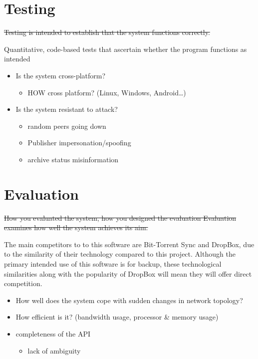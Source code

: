 \documentclass[12pt,a4paper,]{adreport}
\begin{document}
\chapter{Testing}\label{testing}

\sout{Testing is intended to establish that the system functions
correctly.}

Quantitative, code-based tests that ascertain whether the program
functions as intended

\begin{itemize}
\itemsep1pt\parskip0pt
\item
  Is the system cross-platform?

  \begin{itemize}
  \itemsep1pt\parskip0pt
  \item
    HOW cross platform? (Linux, Windows, Android\ldots{})
  \end{itemize}
\item
  Is the system resistant to attack?

  \begin{itemize}
  \itemsep1pt\parskip0pt
  \item
    random peers going down
  \item
    Publisher impersonation/spoofing
  \item
    archive status misinformation
  \end{itemize}
\end{itemize}

\chapter{Evaluation}\label{evaluation}

\sout{How you evaluated the system, how you designed the evaluation
Evaluation examines how well the system achieves its aim.}

The main competitors to to this software are Bit-Torrent Sync and
DropBox, due to the similarity of their technology compared to this
project. Although the primary intended use of this software is for
backup, these technological similarities along with the popularity of
DropBox will mean they will offer direct competition.

\begin{itemize}
\itemsep1pt\parskip0pt
\item
  How well does the system cope with sudden changes in network topology?
\item
  How efficient is it? (bandwidth usage, processor \& memory usage)
\item
  completeness of the API

  \begin{itemize}
  \itemsep1pt\parskip0pt
  \item
    lack of ambiguity
  \end{itemize}
\end{itemize}
\end{document}
